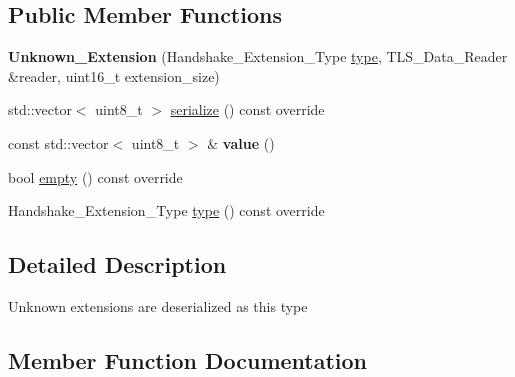 \subsection*{Public Member Functions}
\begin{DoxyCompactItemize}
\item 
\mbox{\label{class_botan_1_1_t_l_s_1_1_unknown___extension_a6a195a91a10e4198aaf4054a75629a44}} 
{\bfseries Unknown\+\_\+\+Extension} (Handshake\+\_\+\+Extension\+\_\+\+Type \hyperlink{class_botan_1_1_t_l_s_1_1_unknown___extension_a3662bce2ca66c928000baba33369623d}{type}, T\+L\+S\+\_\+\+Data\+\_\+\+Reader \&reader, uint16\+\_\+t extension\+\_\+size)
\item 
std\+::vector$<$ uint8\+\_\+t $>$ \hyperlink{class_botan_1_1_t_l_s_1_1_unknown___extension_a1a706433e22a0b2bb3ab044fadd4f5a1}{serialize} () const override
\item 
\mbox{\label{class_botan_1_1_t_l_s_1_1_unknown___extension_afc7367cc5eea695277f9b6c6b95c1870}} 
const std\+::vector$<$ uint8\+\_\+t $>$ \& {\bfseries value} ()
\item 
bool \hyperlink{class_botan_1_1_t_l_s_1_1_unknown___extension_a0b2f674ad0a239c57c20eda9caf60783}{empty} () const override
\item 
Handshake\+\_\+\+Extension\+\_\+\+Type \hyperlink{class_botan_1_1_t_l_s_1_1_unknown___extension_a3662bce2ca66c928000baba33369623d}{type} () const override
\end{DoxyCompactItemize}


\subsection{Detailed Description}
Unknown extensions are deserialized as this type 

\subsection{Member Function Documentation}
\mbox{\label{class_botan_1_1_t_l_s_1_1_unknown___extension_a0b2f674ad0a239c57c20eda9caf60783}} 
